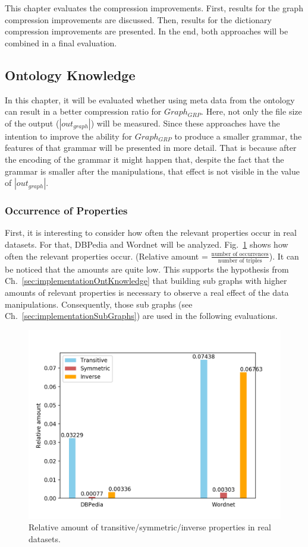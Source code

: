 This chapter evaluates the compression improvements. First, results for the graph compression improvements  are discussed. Then, results for the dictionary compression improvements are presented.  In the end, both approaches will be combined in a final evaluation.

\subsection{Ontology Knowledge}\label{sec:evaluationOntKnowledge}

In this chapter, it will be evaluated whether using meta data from the ontology can result in a better compression ratio for $Graph_{GRP}$. Here, not only the file size of the output ($|out_{graph}|$) will be measured. Since these approaches have the intention to improve the ability for $Graph_{GRP}$ to produce a smaller grammar, the features of that grammar will be presented in more detail. That is because after the encoding of the grammar it might happen that, despite the fact that the grammar is smaller after the manipulations, that effect is not visible in the value of $|out_{graph}|$. 

\subsubsection{Occurrence of Properties}
First, it is interesting to consider how often the relevant properties occur in real datasets.  For that, DBPedia and Wordnet will be analyzed. Fig.~\ref{fig:ontoccurrences} shows how often the relevant properties occur. (Relative amount = $\frac{\text{number of occurrences}}{\text{number of triples}}$). It can be noticed that the amounts are quite low. This supports the hypothesis from Ch.~\ref{sec:implementationOntKnowledge} that building sub graphs with higher amounts of relevant properties is necessary to observe a real effect of the data manipulations. Consequently, those sub graphs (see Ch.~\ref{sec:implementationSubGraphs}) are used in the following evaluations.

\begin{figure}
	\centering
	\includegraphics[width=0.7\linewidth]{figures/4_evaluation/ontOccurrences}
	\caption{Relative amount of transitive/symmetric/inverse properties in real datasets.}
	\label{fig:ontoccurrences}
\end{figure}

